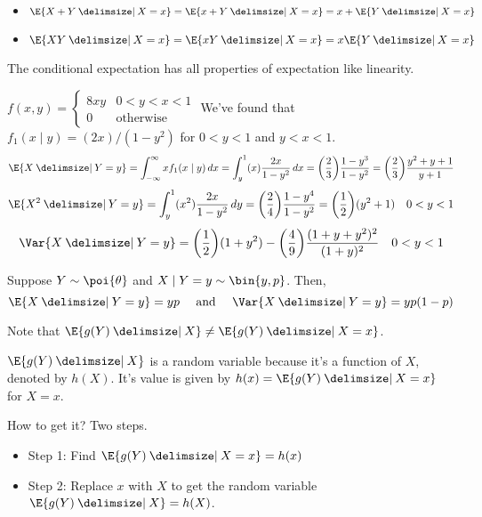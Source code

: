 \begin{Example}{}{}
    \begin{itemize}
        \item $ \E{X+Y\given X=x}=\E{x+Y\given X=x}=x+\E{Y\given X=x} $
        \item $ \E{XY\given X=x}=\E{xY\given X=x}=x\E{Y\given X=x} $
    \end{itemize}
\end{Example}
\begin{Theorem}{}{}
    The conditional expectation has all properties of expectation like
    linearity.
\end{Theorem}
\begin{Example}{}{}
    $ \displaystyle f(x,y)=\begin{cases}
            8 x y & 0<y<x<1          \\
            0     & \text{otherwise}
        \end{cases} $
    We've found that $ f_1(x\mid y)=(2x)/(1-y^2) $ for $ 0<y<1 $ and $ y<x<1 $.
    \[ \E{X\given Y=y}=\int_{-\infty}^{\infty} x f_1(x\mid y)\, d{x}=
        \int_{y}^{1} (x) \frac{2x}{1-y^2}\, d{x}=\biggl( \frac{2}{3} \biggr)
        \frac{1-y^3}{1-y^2}=\biggl( \frac{2}{3}  \biggr)
        \frac{y^2+y+1}{y+1}   \]
    \[ \E{X^2\given Y=y}=\int_{y}^{1} (x^2)
        \frac{2x}{1-y^2} \, d{y}=\biggl( \frac{2}{4} \biggr)
        \frac{1-y^4}{1-y^2}=\biggl( \frac{1}{2}  \biggr)(y^2+1)\quad 0<y<1 \]
    \[ \Var{X\given Y=y}=\biggl( \frac{1}{2} \biggr) (1+y^2)-
        \biggl( \frac{4}{9}  \biggr)\frac{(1+y+y^2)^2}{(1+y)^2}\quad 0<y<1  \]
\end{Example}
\begin{Example}{}{}
    Suppose $ Y \sim \poi{\theta} $ and $ X\mid Y=y \sim \bin{y,p} $. Then,
    \[ \E{X\given Y=y}=yp\quad\text{ and }\quad\Var{X\given Y=y}=yp(1-p) \]
\end{Example}
\begin{Remark}{}{}
    Note that $ \E{g(Y)\given X}\neq \E{g(Y)\given X=x} $.

    $ \E{g(Y)\given X} $ is a random variable because it's a function
    of $ X $, denoted by $ h(X) $. It's value is given by $ h(x)=
        \E{g(Y)\given X=x} $ for $ X=x $.

    How to get it? Two steps.
    \begin{itemize}
        \item Step 1: Find $ \E{g(Y)\given X=x}=h(x) $
        \item Step 2: Replace $ x $ with
              $ X $ to get the random variable $ \E{g(Y)\given X}=h(X) $.
    \end{itemize}
\end{Remark}

